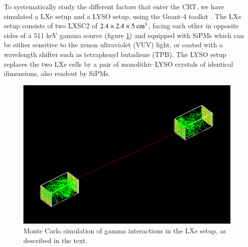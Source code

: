 \documentclass[review]{elsarticle}
\begin{document}
To systematically study the different factors that enter the CRT, we have simulated a LXe setup and a LYSO setup, using the Geant-4 toolkit \cite{Agostinelli:2002hh}. The LXe setup consists of two LXSC2 of 
$2.4 \times 2.4 \times 5 {\rm ~cm^3}$, facing each other in opposite sides of a 511 keV gamma source 
(figure \ref{fig.psetup}) and equipped with SiPMs which can be either sensitive to the xenon ultraviolet (VUV) light, or coated with a wavelength shifter such as tetraphenyl butadiene (TPB). The  LYSO setup replaces the two LXe cells by a pair of  monolithic LYSO crystals of identical dimensions, also readout by SiPMs.

 \begin{figure}[!bthp]
	\centering
	\includegraphics[scale=0.4]{../img/PetaloSetup.png}
	\caption{\label{fig.psetup} Monte Carlo simulation of gamma interactions in the LXe setup, as 
	described in the text.}
\end{figure}


%
\end{document}
